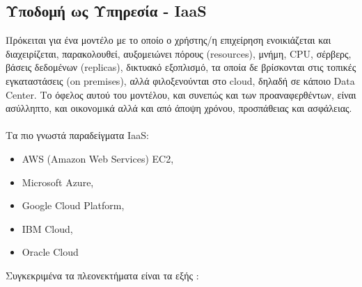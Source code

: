 \documentclass{article}
\begin{document}
\subsection{Υποδομή ως Υπηρεσία - IaaS}
Πρόκειται για ένα μοντέλο με το οποίο ο χρήστης/η επιχείρηση ενοικιάζεται και διαχειρίζεται, παρακολουθεί, αυξομειώνει πόρους (resources), μνήμη, CPU, σέρβερς, βάσεις δεδομένων (replicas), δικτυακό εξοπλισμό, τα οποία δε βρίσκονται στις τοπικές εγκαταστάσεις (on premises), αλλά φιλοξενούνται στο cloud, δηλαδή σε κάποιο Data Center. Το όφελος αυτού του μοντέλου, και συνεπώς και των προαναφερθέντων, είναι ασύλληπτο, και οικονομικά αλλά και από άποψη χρόνου, προσπάθειας και ασφάλειας. \\ \\
Τα πιο γνωστά παραδείγματα IaaS:
\begin{itemize}
\item AWS (Amazon Web Services) EC2, 
\item Microsoft Azure, 
\item Google Cloud Platform, 
\item IBM Cloud, 
\item Oracle Cloud
\end{itemize}
Συγκεκριμένα τα πλεονεκτήματα είναι τα εξής : 
\end{document}
